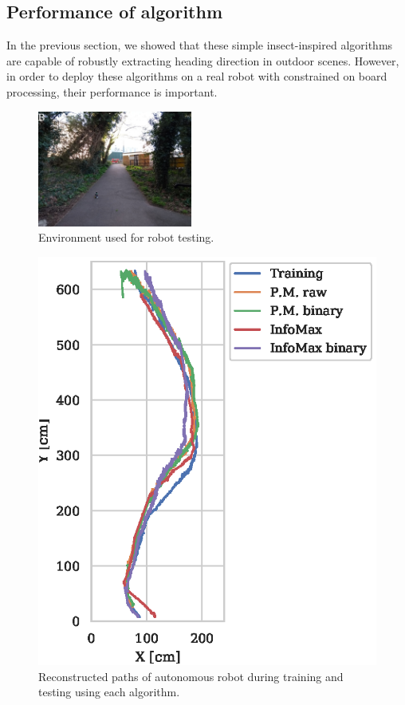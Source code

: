 \documentclass[letterpaper]{article}
\begin{document}
\subsection{Performance of algorithm}
In the previous section, we showed that these simple insect-inspired algorithms are capable of robustly extracting heading direction in outdoor scenes. 
However, in order to deploy these algorithms on a real robot with constrained on board processing, their performance is important. 


\begin{figure}[t]
    \centering
    \includegraphics[width=2in]{figures/robot_environment.jpg}
    \caption{Environment used for robot testing.}
    \label{fig:robot_environment}
\end{figure}

\begin{figure}[t]
    \centering
    \includegraphics{figures/robot_paths.eps}
    \caption{Reconstructed paths of autonomous robot during training and testing using each algorithm.}
    \label{fig:robot_paths}
\end{figure}
\end{document}
